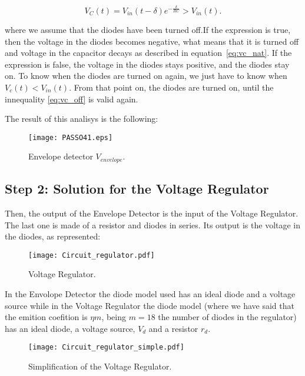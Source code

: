 \begin{equation}
  V_{C}(t) = V_{in}(t-\delta) e^{-\frac{\delta}{RC}} > V_{in}(t).
  \label{eq:vc_off}
\end{equation}

where we assume that the diodes have been turned off.If the expression is true, then the voltage in the diodes becomes negative, what means that it is turned off and voltage in the capacitor decays as described in equation~\ref{eq:vc_nat}. If the expression is false, the voltage in the diodes stays positive, and the diodes stay on.
To know when the diodes are turned on again, we just have to know when $V_{c}(t)<V_{in}(t)$. From that point on, the diodes are turned on, until the innequality \ref{eq:vc_off} is valid again.

The result of this analisys is the following:

\begin{figure}[h] \centering
\texttt{[image: PASSO41.eps]}
\caption{Envelope detector $V_{envelope}$.}
\label{fig:TEO_ENV}
\end{figure}

\newpage

\subsection{Step 2: Solution for the Voltage Regulator}

Then, the output of the Envelope Detector is the input of the Voltage Regulator. The last one is made of a resistor and diodes in series. Its output is the voltage in the diodes, as represented:

\begin{figure}[h] \centering
\texttt{[image: Circuit\_regulator.pdf]}
\caption{Voltage Regulator.}
\label{fig:TEO_VR_CIR}
\end{figure}

In the Envolope Detector the diode model used has an ideal diode and a voltage source while in the Voltage Regulator the diode model (where we have said that the emition coefition is $\eta m$, being $m=18$ the number of diodes in the regulator) has an ideal diode, a voltage source, $V_{d}$ and a resistor $r_{d}$. 

\begin{figure}[h] \centering
\texttt{[image: Circuit\_regulator\_simple.pdf]}
\caption{Simplification of the Voltage Regulator.}
\label{fig:TEO_VR_CIR_S}
\end{figure}

